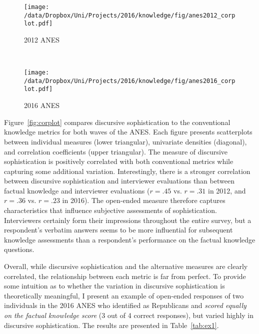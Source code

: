 \begin{figure*}[h]
    \centering
    \begin{subfigure}[t]{0.5\textwidth}
        \centering
        \texttt{[image: /data/Dropbox/Uni/Projects/2016/knowledge/fig/anes2012\_corplot.pdf]}
        \caption{2012 ANES}
    \end{subfigure}%
    ~ 
    \begin{subfigure}[t]{0.5\textwidth}
        \centering
        \texttt{[image: /data/Dropbox/Uni/Projects/2016/knowledge/fig/anes2016\_corplot.pdf]}
        \caption{2016 ANES}
    \end{subfigure}
    \caption[Correlation matrix of discursive sophistication and conventional political knowledge metrics]{Correlation matrix of discursive sophistication and conventional political knowledge metrics. The plots on the diagonal display univariate densities for each variable. The panels in the lower triangular display the scatter plot of two measures as well as a linear fit. The upper triangular displays the correlation coefficient. All correlations reported are statistically significant with $p<.05$.}\label{fig:corplot}
\end{figure*}

Figure~\ref{fig:corplot} compares discursive sophistication to the conventional knowledge metrics for both waves of the ANES. Each figure presents scatterplots between individual measures (lower triangular), univariate densities (diagonal), and correlation coefficients (upper triangular). The measure of discursive sophistication is positively correlated with both conventional metrics while capturing some additional variation. Interestingly, there is a stronger correlation between discursive sophistication and interviewer evaluations than between factual knowledge and interviewer evaluations ($r=.45$ vs. $r=.31$ in 2012, and $r=.36$ vs. $r=.23$ in 2016). The open-ended measure therefore captures characteristics that influence subjective assessments of sophistication. Interviewers certainly form their impressions throughout the entire survey, but a respondent's verbatim answers seems to be more influential for subsequent knowledge assessments than a respondent's performance on the factual knowledge questions.

Overall, while discursive sophistication and the alternative measures are clearly correlated, the relationship between each metric is far from perfect. To provide some intuition as to whether the variation in discursive sophistication is theoretically meaningful, I present an example of open-ended responses of two individuals in the 2016 ANES who identified as Republicans and \textit{scored equally on the factual knowledge score} (3 out of 4 correct responses), but varied highly in discursive sophistication. The results are presented in Table~\ref{tab:ex1}.

